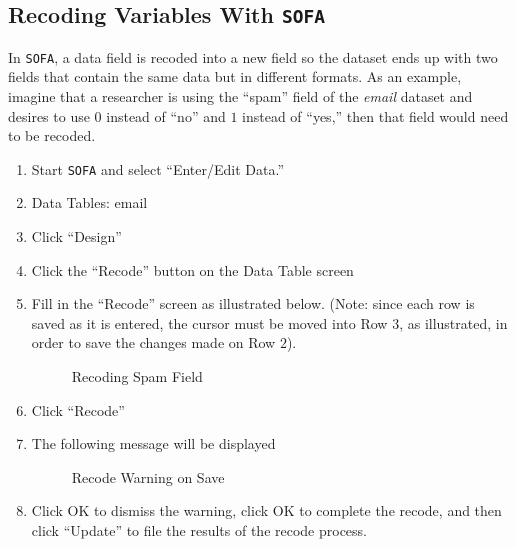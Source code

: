 \subsection{Recoding Variables With \texttt{SOFA}}

In \texttt{SOFA}, a data field is recoded into a new field so the dataset ends up with two fields that contain the same data but in different formats. As an example, imagine that a researcher is using the ``spam'' field of the \textit{email} dataset and desires to use $ 0 $ instead of ``no'' and $ 1 $ instead of ``yes,'' then that field would need to be recoded.

\begin{enumerate}
  \item {Start \texttt{SOFA} and select ``Enter/Edit Data.''}
  \item Data Tables: email
  \item Click ``Design''
  \item Click the ``Recode'' button on the Data Table screen
  \item Fill in the ``Recode'' screen as illustrated below. (Note: since each row is saved as it is entered, the cursor must be moved into Row $ 3 $, as illustrated, in order to save the changes made on Row $ 2 $).
  
  \begin{figure}[H]
    \begin{center}
      \caption{Recoding Spam Field}
    \end{center}
  \end{figure}
  
  \item Click ``Recode''
  \item The following message will be displayed
  
  \begin{figure}[H]
    \begin{center}
      \caption{Recode Warning on Save}
    \end{center}
  \end{figure}
  
  \item Click OK to dismiss the warning, click OK to complete the recode, and then click ``Update'' to file the results of the recode process.

\end{enumerate}

